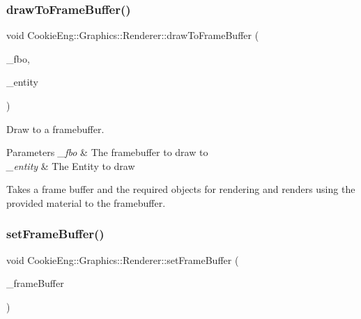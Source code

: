 \subsubsection{\texorpdfstring{draw\+To\+Frame\+Buffer()}{drawToFrameBuffer()}\hspace{0.1cm}{\footnotesize\ttfamily [2/2]}}
{\footnotesize\ttfamily void Cookie\+Eng\+::\+Graphics\+::\+Renderer\+::draw\+To\+Frame\+Buffer (\begin{DoxyParamCaption}\item[{const \hyperlink{class_cookie_eng_1_1_graphics_1_1_frame_buffer}{Frame\+Buffer} \&}]{\+\_\+fbo,  }\item[{\hyperlink{class_cookie_eng_1_1_e_c_s_1_1_entity}{E\+C\+S\+::\+Entity} \&}]{\+\_\+entity }\end{DoxyParamCaption})}



Draw to a framebuffer. 


\begin{DoxyParams}{Parameters}
{\em \+\_\+fbo} & The framebuffer to draw to \\
\hline
{\em \+\_\+entity} & The Entity to draw\\
\hline
\end{DoxyParams}
Takes a frame buffer and the required objects for rendering and renders using the provided material to the framebuffer. \mbox{\label{class_cookie_eng_1_1_graphics_1_1_renderer_a9e8bce3cb731b1f09ca5bc4bc863414b}} 
\subsubsection{\texorpdfstring{set\+Frame\+Buffer()}{setFrameBuffer()}}
{\footnotesize\ttfamily void Cookie\+Eng\+::\+Graphics\+::\+Renderer\+::set\+Frame\+Buffer (\begin{DoxyParamCaption}\item[{\hyperlink{class_cookie_eng_1_1_graphics_1_1_frame_buffer}{Frame\+Buffer} $\ast$}]{\+\_\+frame\+Buffer }\end{DoxyParamCaption})\hspace{0.3cm}{\ttfamily [inline]}}



